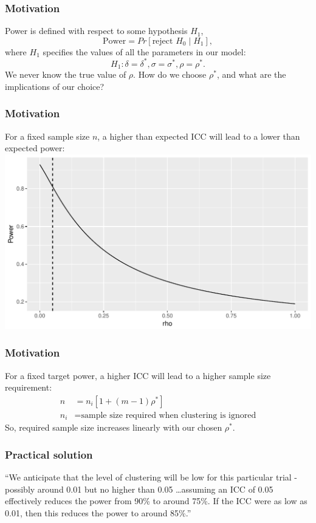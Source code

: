 \documentclass{beamer}
\begin{document}
\begin{frame}
\frametitle{Motivation}
Power is defined with respect to some hypothesis $H_{1}$,
\begin{equation*}
\text{Power} = Pr[ \text{reject } H_{0} \mid H_{1} ],
\end{equation*}
where $H_{1}$ specifies the values of all the parameters in our model:
\begin{equation*}
H_{1}: \delta = \delta^{*}, \sigma = \sigma^{*}, \rho = \rho^{*}.
\end{equation*}
We never know the true value of $\rho$. How do we choose $\rho^{*}$, and what are the implications of our choice?
\end{frame}

\begin{frame}
\frametitle{Motivation}
For a fixed sample size $n$, a higher than expected ICC will lead to a lower than expected power:\\
\vspace{3mm}
\includegraphics[scale=0.5]{power}
\end{frame}

\begin{frame}
\frametitle{Motivation}
For a fixed target power, a higher ICC will lead to a higher sample size requirement:
\begin{align*}
n &= n_{i}[1+(m-1)\rho^{*}] \\
n_{i} &= \text{sample size required when clustering is ignored}
\end{align*}
So, required sample size increases linearly with our chosen $\rho^{*}$.
\end{frame}

\begin{frame}
\frametitle{Practical solution}
\begin{example}[SHIFT]
``We anticipate that the level of clustering will be low for this particular trial - possibly around 0.01 but no higher than 0.05 \ldots assuming an ICC of 0.05 effectively reduces the power from 90\% to around 75\%. If the ICC were as low as 0.01, then this reduces the power to around 85\%.''
\end{example}
\end{frame}
\end{document}
